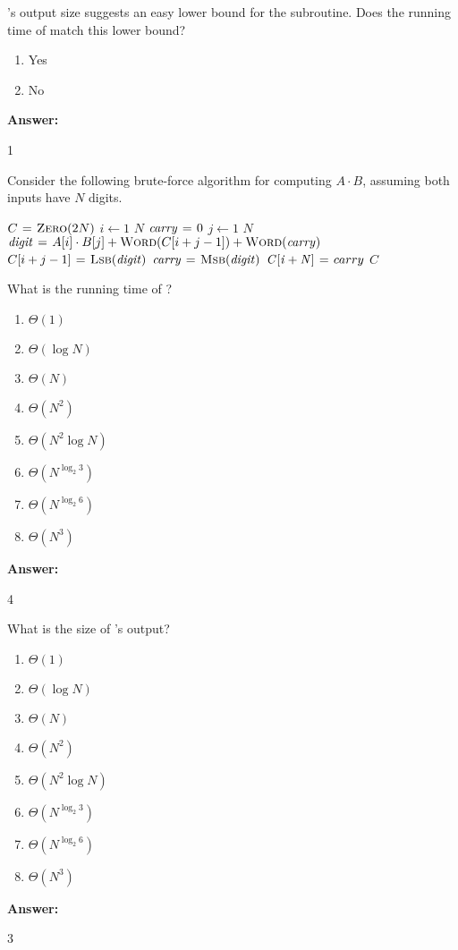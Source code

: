 \documentclass[12pt,twoside]{article}
\newcommand{\answer}{
 \par\medskip
 \textbf{Answer:}
}
\newcommand{\answerIc}{ \answer
1
}
\newcommand{\answerId}{ \answer
4
}
\newcommand{\answerIe}{ \answer
3
}
\begin{document}
\begin{problems}
\begin{problemparts}
\problempart {} 's output size suggests an easy lower bound
for the subroutine. Does the running time of  match this lower bound?
\begin{enumerate}
  \item Yes
  \item No
\end{enumerate}
\answerIc

\end{problemparts}

Consider the following brute-force algorithm for computing $A \cdot B$, assuming
both inputs have $N$ digits.

\begin{codebox}
\li $C \mathrel{\hspace{1pt}=\hspace{1pt}} \textnormal{\scshape Zero}(2N)$
\li \For $i \gets 1$ \To $N$ \label{li:mul-for1}
\li   \Do
        $\id{carry} \gets 0$
\li     \For $j \gets 1$ \To $N$ \label{li:mul-for2}
\li        \Do
             $\id{digit} \gets A[i] \cdot B[j] + \proc{Word}(C[i + j - 1]) +
                               \proc{Word}(\id{carry})$
\li           $C[i + j - 1] \gets \proc{Lsb}(\id{digit})$
\li           $\id{carry} \gets \proc{Msb}(\id{digit})$
           \End
\li     $\id{C[i + N]} \gets carry$
      \End
\li \Return $C$
\end{codebox}

\begin{problemparts}
\problempart {} What is the running time of ?
\begin{enumerate}
  \item $\Theta(1)$
  \item $\Theta(\log N)$
  \item $\Theta(N)$
  \item $\Theta(N^2)$
  \item $\Theta(N^2 \log N)$
  \item $\Theta(N^{\log_2 3})$
  \item $\Theta(N^{\log_2 6})$
  \item $\Theta(N^3)$
\end{enumerate}
\answerId

\problempart {} What is the size of 's output?
\begin{enumerate}
  \item $\Theta(1)$
  \item $\Theta(\log N)$
  \item $\Theta(N)$
  \item $\Theta(N^2)$
  \item $\Theta(N^2 \log N)$
  \item $\Theta(N^{\log_2 3})$
  \item $\Theta(N^{\log_2 6})$
  \item $\Theta(N^3)$
\end{enumerate}
\answerIe


\end{problemparts}
\end{problems}
\end{document}
